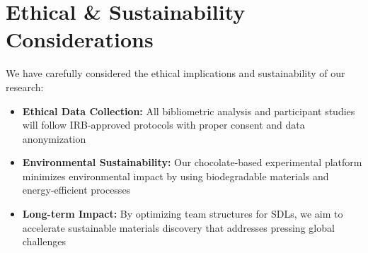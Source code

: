 \documentclass[11pt,letterpaper,twocolumn]{article}
\begin{document}
\section{Ethical \& Sustainability Considerations}
We have carefully considered the ethical implications and sustainability of our research:

\begin{itemize}
    \item \textbf{Ethical Data Collection:} All bibliometric analysis and participant studies will follow IRB-approved protocols with proper consent and data anonymization
    \item \textbf{Environmental Sustainability:} Our chocolate-based experimental platform minimizes environmental impact by using biodegradable materials and energy-efficient processes
    \item \textbf{Long-term Impact:} By optimizing team structures for SDLs, we aim to accelerate sustainable materials discovery that addresses pressing global challenges
\end{itemize}



\end{document}
